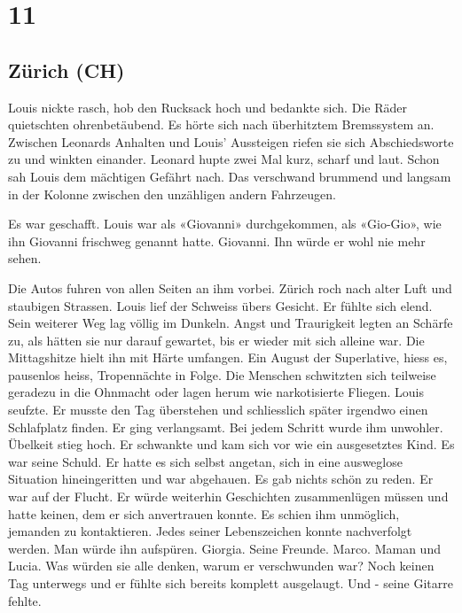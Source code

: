 \chapter{11}

\section{Zürich (CH)}



Louis nickte rasch, hob den Rucksack hoch und bedankte sich.
Die Räder quietschten ohrenbetäubend. Es hörte sich nach überhitztem Bremssystem an. 
Zwischen Leonards Anhalten und Louis’ Aussteigen riefen sie sich Abschiedsworte zu und winkten
einander. Leonard hupte zwei Mal kurz, scharf und laut. Schon sah Louis
dem mächtigen Gefährt nach. Das verschwand brummend und langsam in der
Kolonne zwischen den unzähligen andern Fahrzeugen.

\sectionbreak

Es war geschafft. Louis war als «Giovanni» durchgekommen, als «Gio-Gio»,
wie ihn Giovanni frischweg genannt hatte. Giovanni. Ihn würde er wohl
nie mehr sehen.

Die Autos fuhren von allen Seiten an ihm vorbei.
Zürich roch nach alter Luft und staubigen Strassen. Louis lief der
Schweiss übers Gesicht. Er fühlte sich elend. Sein weiterer Weg lag völlig im
Dunkeln. Angst und Traurigkeit legten an Schärfe zu, als hätten sie nur
darauf gewartet, bis er wieder mit sich alleine war. Die Mittagshitze hielt ihn mit Härte umfangen. Ein August der
Superlative, hiess es, pausenlos heiss, Tropennächte in Folge. Die
Menschen schwitzten sich teilweise geradezu in die Ohnmacht oder lagen
herum wie narkotisierte Fliegen.
Louis seufzte. Er musste den Tag überstehen und schliesslich später irgendwo einen Schlafplatz finden.
Er ging verlangsamt. Bei jedem Schritt wurde ihm unwohler. Übelkeit
stieg hoch. Er schwankte und kam sich vor wie ein ausgesetztes Kind. 
Es war seine Schuld. Er hatte es sich selbst angetan, sich in eine
ausweglose Situation hineingeritten und war abgehauen. Es gab nichts
schön zu reden. Er war auf der Flucht. Er würde weiterhin Geschichten
zusammenlügen müssen und hatte keinen, dem er sich anvertrauen konnte.
Es schien ihm unmöglich, jemanden zu kontaktieren. Jedes seiner
Lebenszeichen konnte nachverfolgt werden. Man würde ihn aufspüren.
Giorgia. Seine Freunde. Marco. Maman und Lucia.
Was würden sie alle denken, warum er verschwunden war? Noch keinen Tag
unterwegs und er fühlte sich bereits komplett ausgelaugt.
Und - seine Gitarre fehlte.

